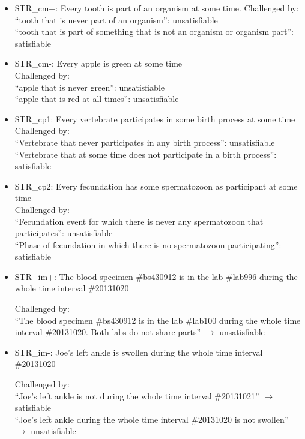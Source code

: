 \begin{itemize}
\item STR\_cm+: Every tooth is part of an organism at some time. Challenged by: \\ ``tooth that is never part of an organism'': unsatisfiable \\
``tooth that is part of something that is not an organism or organism part'': satisfiable 


\item STR\_cm-: Every apple is green at some time
\\
Challenged by: \\ ``apple that is never green'': unsatisfiable \\
``apple that is red at all times'': unsatisfiable 


\item STR\_cp1: Every vertebrate participates in some birth process at some time\\
Challenged by: \\ ``Vertebrate that never participates in any birth process'': unsatisfiable \\
``Vertebrate that at some time does not participate in a birth process'': satisfiable 



\item STR\_cp2: Every fecundation has some spermatozoon as participant at some time
\\
Challenged by: \\ ``Fecundation event for which there is never any spermatozoon that participates'': unsatisfiable \\
``Phase of fecundation in which there is no spermatozoon participating'': satisfiable 




\item STR\_im+: The blood specimen \#bs430912 is in the lab \#lab996 during the whole time interval \#20131020

Challenged by: \\ ``The blood specimen \#bs430912 is in the lab \#lab100 during the whole time interval \#20131020. Both labs do not share parts'' $\rightarrow$ unsatisfiable



\item STR\_im-: Joe's left ankle is swollen during the whole time interval \#20131020

Challenged by: \\ ``Joe's left ankle is not during the whole time interval \#20131021'' $\rightarrow$ satisfiable
\\ 
``Joe's left ankle during the whole time interval \#20131020 is not swollen'' $\rightarrow$ unsatisfiable




\end{itemize}
